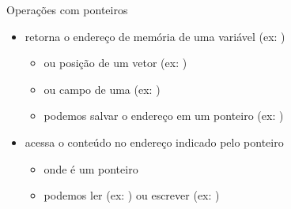\documentclass{beamer}
\begin{document}
\begin{frame}[<+->]{Operações com ponteiros}
  \begin{itemize}
    \item \alert{\cod{\&}} retorna o endereço de memória de uma variável (ex: )
      \begin{itemize}
        \item ou posição de um vetor (ex: )
        \item ou campo de uma  (ex: )
        \item podemos salvar o endereço em um ponteiro (ex: )
      \end{itemize}
    \item \alert{\cod{*}} acessa o conteúdo no endereço indicado pelo ponteiro
      \begin{itemize}
        \item {} onde  é um ponteiro
        \item podemos ler (ex: ) ou escrever (ex: )
      \end{itemize}
  \end{itemize}

  \bigskip

  \begin{columns}
    \begin{column}{0.57\linewidth}
      
    \end{column}
    \begin{column}{0.43\linewidth}
      \centering
    \end{column}
  \end{columns}
\end{frame}
\end{document}

